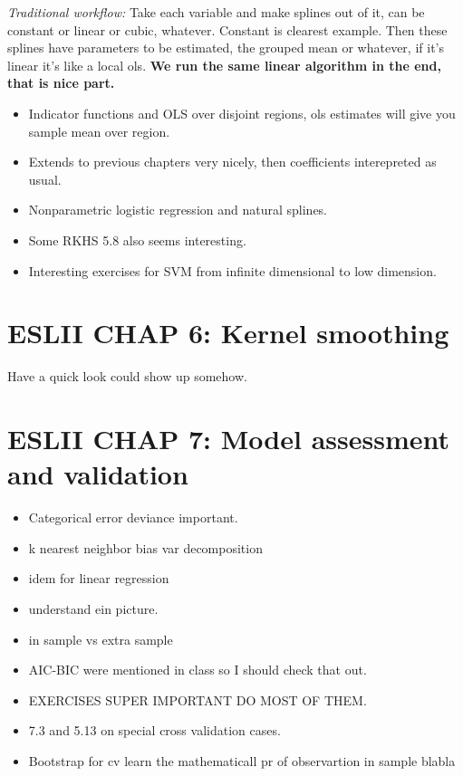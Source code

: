 \documentclass{article}
\begin{document}
\textit{Traditional workflow:}
Take each variable and make splines out of it, can be constant or linear or cubic, whatever. Constant is clearest example.
Then these splines have parameters to be estimated, the grouped mean or whatever, if it's linear it's like a local ols.
\textbf{We run the same linear algorithm in the end, that is nice part.}

\begin{itemize}
    \item Indicator functions and OLS over disjoint regions, ols estimates will give 
    you sample mean over region.
    \item Extends to previous chapters very nicely, then coefficients interepreted as usual. 
    \item Nonparametric logistic regression and natural splines.
    \item Some RKHS 5.8 also seems interesting.
    \item Interesting exercises for SVM from infinite dimensional to low dimension.
\end{itemize}

\section*{ESLII CHAP 6: Kernel smoothing}
Have a quick look could show up somehow.



\section*{ESLII CHAP 7: Model assessment and validation}

\begin{itemize}
    \item Categorical error deviance important.
    \item k nearest neighbor bias var decomposition 
    \item idem for linear regression
    \item understand ein picture.
    \item in sample vs extra sample 
    \item AIC-BIC were mentioned in class so I should check that out. 
    \item EXERCISES SUPER IMPORTANT DO MOST OF THEM.
    \item 7.3 and 5.13 on special cross validation cases.
    \item Bootstrap for cv learn the mathematicall pr of observartion in sample blabla
\end{itemize}
\end{document}
